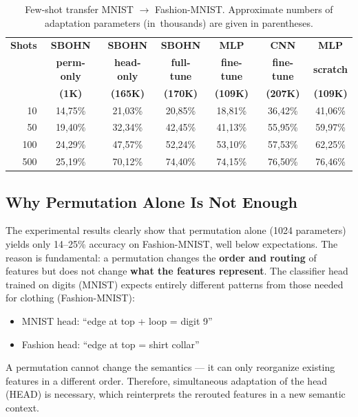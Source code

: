 \documentclass[11pt,a4paper]{report}
\begin{document}
\begin{table}[htbp]
\centering
\caption{Few-shot transfer MNIST $\to$ Fashion-MNIST. Approximate numbers of adaptation parameters (in~thousands) are given in parentheses.}
\label{tab:fewshot_transfer}
\begin{tabular}{r|c|c|c|c|c|c}
\hline
\textbf{Shots} & \textbf{SBOHN} & \textbf{SBOHN} & \textbf{SBOHN} & \textbf{MLP} & \textbf{CNN} & \textbf{MLP} \\
       & \textbf{perm-only} & \textbf{head-only} & \textbf{full-tune} & \textbf{fine-tune} & \textbf{fine-tune} & \textbf{scratch} \\
       & \textbf{(1K)} & \textbf{(165K)} & \textbf{(170K)} & \textbf{(109K)} & \textbf{(207K)} & \textbf{(109K)} \\
\hline
10  & 14{,}75\% & 21{,}03\% & 20{,}85\% & 18{,}81\% & 36{,}42\% & 41{,}06\% \\
50  & 19{,}40\% & 32{,}34\% & 42{,}45\% & 41{,}13\% & 55{,}95\% & 59{,}97\% \\
100 & 24{,}29\% & 47{,}57\% & 52{,}24\% & 53{,}10\% & 57{,}53\% & 62{,}25\% \\
500 & 25{,}19\% & 70{,}12\% & 74{,}40\% & 74{,}15\% & 76{,}50\% & 76{,}46\% \\
\hline
\end{tabular}
\end{table}

\subsection{Why Permutation Alone Is Not Enough}

The experimental results clearly show that permutation alone (1024 parameters) yields only 14--25\% accuracy on Fashion-MNIST, well below expectations. The reason is fundamental: a permutation changes the \textbf{order and routing} of features but does not change \textbf{what the features represent}. The classifier head trained on digits (MNIST) expects entirely different patterns from those needed for clothing (Fashion-MNIST):

\begin{itemize}
    \item MNIST head: ``edge at top + loop = digit 9''
    \item Fashion head: ``edge at top = shirt collar''
\end{itemize}

A permutation cannot change the semantics --- it can only reorganize existing features in a different order. Therefore, simultaneous adaptation of the head (HEAD) is necessary, which reinterprets the rerouted features in a new semantic context.
\end{document}
